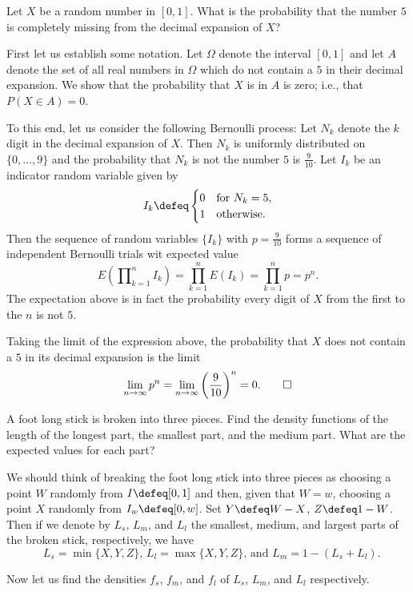 \begin{problem}[Handout 18, \# 16]
  Let \(X\) be a random number in \([0,1]\). What is the probability that
  the number \(5\) is completely missing from the decimal expansion of
  \(X\)?
\end{problem}
\begin{solution}
  First let us establish some notation. Let \(\Omega\) denote the interval
  \([0,1]\) and let \(A\) denote the set of all real numbers in \(\Omega\)
  which do not contain a \(5\) in their decimal expansion. We show that the
  probability that \(X\) is in \(A\) is zero; i.e., that \(P(X\in A)=0\).

  To this end, let us consider the following Bernoulli process: Let \(N_k\)
  denote the \(k\) digit in the decimal expansion of
  \(X\). Then \(N_k\) is uniformly distributed on \(\{0,\dotsc,9\}\) and
  the probability that \(N_k\) is not the number \(5\) is
  \(\frac{9}{10}\). Let \(I_k\) be an indicator random variable given by
  \[
    I_k\defeq%
    \begin{cases}%
      0&\text{for \(N_k=5\),}\\
      1&\text{otherwise.}
    \end{cases}
  \]
  Then the sequence of random variables \(\{I_k\}\) with \(p=\frac{9}{10}\)
  forms a sequence of independent Bernoulli trials wit expected value
  \[
    E\left(\prod\nolimits_{k=1}^n I_k\right)=%
    \prod_{k=1}^n E(I_k)=%
    \prod_{k=1}^n p=p^n.
  \]
  The expectation above is in fact the probability every digit of \(X\)
  from the first to the \(n\) is not \(5\).

  Taking the limit of the expression above, the probability that \(X\) does
  not contain a \(5\) in its decimal expansion is the limit
  \[
    \lim_{n\to\infty}
    p^n=\lim_{n\to\infty}\left(\frac{9}{10}\right)^n=0.\qedhere
  \]
\end{solution}
\newpage

\begin{problem}[Handout 18, \# 17]
  A foot long stick is broken into three pieces. Find the density functions
  of the length of the longest part, the smallest part, and the medium
  part. What are the expected values for each part?
\end{problem}
\begin{solution}
  We should think of breaking the foot long stick into three pieces as
  choosing a point \(W\) randomly from \(I\defeq [0,1]\) and then, given
  that \(W=w\), choosing a point \(X\) randomly from \(I_w\defeq
  [0,w]\). Set \(Y\defeq W-X\), \(Z\defeq 1-W\). Then if we denote by
  \(L_s\), \(L_m\), and \(L_l\) the smallest, medium, and largest parts
  of the broken stick, respectively, we have
  \[
    \text{ \(L_s=\min\{X,Y,Z\}\), \(L_l=\max\{X,Y,Z\}\), and
      \(L_m=1-(L_s+L_l)\).}
  \]

  Now let us find the densities \(f_s\), \(f_m\), and \(f_l\) of
  \(L_s\), \(L_m\), and \(L_l\) respectively.
\end{solution}

